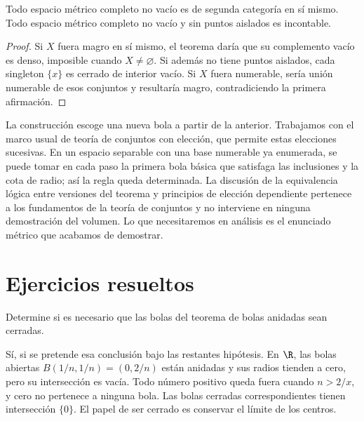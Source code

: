 \begin{corolario}\label{ch10:segunda}
Todo espacio métrico completo no vacío es de segunda categoría en sí mismo. Todo espacio métrico completo no vacío y sin puntos aislados es incontable.
\end{corolario}
\begin{proof}
Si $X$ fuera magro en sí mismo, el teorema daría que su complemento vacío es denso, imposible cuando $X\ne\varnothing$. Si además no tiene puntos aislados, cada singleton $\{x\}$ es cerrado de interior vacío. Si $X$ fuera numerable, sería unión numerable de esos conjuntos y resultaría magro, contradiciendo la primera afirmación.
\end{proof}

\begin{observacion}
La construcción escoge una nueva bola a partir de la anterior. Trabajamos con el marco usual de teoría de conjuntos con elección, que permite estas elecciones sucesivas. En un espacio separable con una base numerable ya enumerada, se puede tomar en cada paso la primera bola básica que satisfaga las inclusiones y la cota de radio; así la regla queda determinada. La discusión de la equivalencia lógica entre versiones del teorema y principios de elección dependiente pertenece a los fundamentos de la teoría de conjuntos y no interviene en ninguna demostración del volumen. Lo que necesitaremos en análisis es el enunciado métrico que acabamos de demostrar.
\end{observacion}

\section{Ejercicios resueltos}
\begin{ejercicio}
Determine si es necesario que las bolas del teorema de bolas anidadas sean cerradas.
\end{ejercicio}
\begin{solucion}
Sí, si se pretende esa conclusión bajo las restantes hipótesis. En $\R$, las bolas abiertas $B(1/n,1/n)=(0,2/n)$ están anidadas y sus radios tienden a cero, pero su intersección es vacía. Todo número positivo queda fuera cuando $n>2/x$, y cero no pertenece a ninguna bola. Las bolas cerradas correspondientes tienen intersección $\{0\}$. El papel de ser cerrado es conservar el límite de los centros.
\end{solucion}

